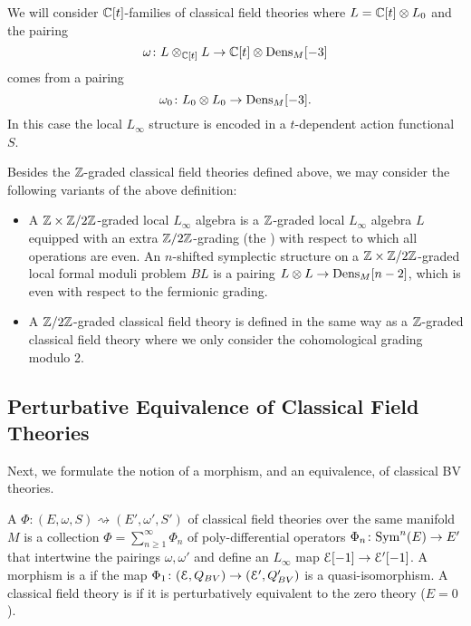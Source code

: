 \documentclass[10pt, oneside]{article}
\begin{document}
We will consider $\mathbb C[t]$-families of classical field theories where $L = \mathbb C[t]\otimes L_0$ and the pairing
\[\omega\colon L\otimes_{\mathbb C[t]} L\rightarrow \mathbb C[t]\otimes \mathrm{Dens}_M[-3]\]
comes from a pairing
\[\omega_0\colon L_0\otimes L_0\rightarrow \mathrm{Dens}_M[-3].\]
In this case the local $L_\infty$ structure is encoded in a $t$-dependent action functional $S$.

\begin{remark}
Besides the $\mathbb Z$-graded classical field theories defined above, we may consider the following variants of the above definition:
\begin{itemize}
\item A $\mathbb Z\times \mathbb Z/2\mathbb Z$-graded local $L_\infty$ algebra is a $\mathbb Z$-graded local $L_\infty$ algebra $L$ equipped with an extra $\mathbb Z/2\mathbb Z$-grading (the ) with respect to which all operations are even. An $n$-shifted symplectic structure on a $\mathbb Z\times\mathbb Z/2\mathbb Z$-graded local formal moduli problem $BL$ is a pairing $L\otimes L\rightarrow \mathrm{Dens}_M[n-2]$, which is even with respect to the fermionic grading.

\item A $\mathbb Z/2\mathbb Z$-graded classical field theory is defined in the same way as a $\mathbb Z$-graded classical field theory where we only consider the cohomological grading modulo 2.
\end{itemize}
\end{remark}


\subsection{Perturbative Equivalence of Classical Field Theories}

Next, we formulate the notion of a morphism, and an equivalence, of classical BV theories. 

\begin{definition}
A  $\Phi\colon (E, \omega, S)\rightsquigarrow (E', \omega', S')$ of classical field theories over the same manifold $M$ is a collection $\Phi =\sum_{n\geq 1}^\infty \Phi_n$ of poly-differential operators $\Phi_n\colon {\rm Sym}^n(E)\rightarrow E'$ that intertwine the pairings $\omega, \omega'$ and define an $L_\infty$ map $\mathcal E[-1]\rightarrow \mathcal E'[-1]$. A morphism is a  if the map $\Phi_1\colon (\mathcal E, Q_{BV})\rightarrow (\mathcal E', Q'_{BV})$ is a quasi-isomorphism. A classical field theory is  if it is perturbatively equivalent to the zero theory ($E = 0$).
\label{def:perturbativeequivalence}
\end{definition}
\end{document}
